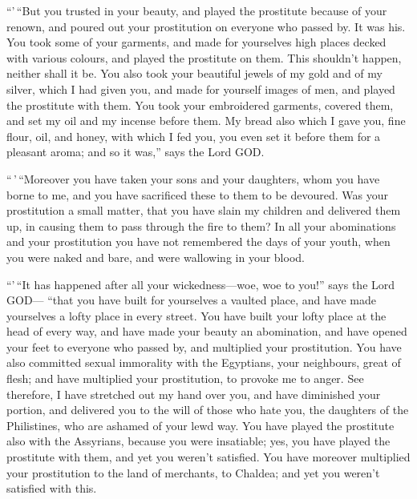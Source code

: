  ``'\,``But you trusted in your beauty, and played the
prostitute because of your renown, and poured out your prostitution on
everyone who passed by. It was his.  You took some of
your garments, and made for yourselves high places decked with various
colours, and played the prostitute on them. This shouldn't happen,
neither shall it be.  You also took your beautiful jewels
of my gold and of my silver, which I had given you, and made for
yourself images of men, and played the prostitute with them.
 You took your embroidered garments, covered them, and
set my oil and my incense before them.  My bread also
which I gave you, fine flour, oil, and honey, with which I fed you, you
even set it before them for a pleasant aroma; and so it was,'' says the
Lord GOD.

 ``\,'\,``Moreover you have taken your sons and your
daughters, whom you have borne to me, and you have sacrificed these to
them to be devoured. Was your prostitution a small matter,
 that you have slain my children and delivered them up,
in causing them to pass through the fire to them?  In all
your abominations and your prostitution you have not remembered the days
of your youth, when you were naked and bare, and were wallowing in your
blood.

 ``'\,``It has happened after all your wickedness---woe,
woe to you!'' says the Lord GOD---  ``that you have built
for yourselves a vaulted place, and have made yourselves a lofty place
in every street.  You have built your lofty place at the
head of every way, and have made your beauty an abomination, and have
opened your feet to everyone who passed by, and multiplied your
prostitution.  You have also committed sexual immorality
with the Egyptians, your neighbours, great of flesh; and have multiplied
your prostitution, to provoke me to anger.  See
therefore, I have stretched out my hand over you, and have diminished
your portion, and delivered you to the will of those who hate you, the
daughters of the Philistines, who are ashamed of your lewd way.
 You have played the prostitute also with the Assyrians,
because you were insatiable; yes, you have played the prostitute with
them, and yet you weren't satisfied.  You have moreover
multiplied your prostitution to the land of merchants, to Chaldea; and
yet you weren't satisfied with this.


